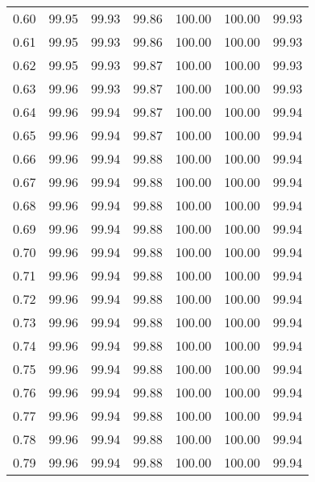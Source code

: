 \begin{tabular}{|c|c|c|c|c|c|c|}
      0.60 &     99.95 &     99.93 &      99.86 &  100.00 &     100.00 &         99.93 \\
      0.61 &     99.95 &     99.93 &      99.86 &  100.00 &     100.00 &         99.93 \\
      0.62 &     99.95 &     99.93 &      99.87 &  100.00 &     100.00 &         99.93 \\
      0.63 &     99.96 &     99.93 &      99.87 &  100.00 &     100.00 &         99.93 \\
      0.64 &     99.96 &     99.94 &      99.87 &  100.00 &     100.00 &         99.94 \\
      0.65 &     99.96 &     99.94 &      99.87 &  100.00 &     100.00 &         99.94 \\
      0.66 &     99.96 &     99.94 &      99.88 &  100.00 &     100.00 &         99.94 \\
      0.67 &     99.96 &     99.94 &      99.88 &  100.00 &     100.00 &         99.94 \\
      0.68 &     99.96 &     99.94 &      99.88 &  100.00 &     100.00 &         99.94 \\
      0.69 &     99.96 &     99.94 &      99.88 &  100.00 &     100.00 &         99.94 \\
      0.70 &     99.96 &     99.94 &      99.88 &  100.00 &     100.00 &         99.94 \\
      0.71 &     99.96 &     99.94 &      99.88 &  100.00 &     100.00 &         99.94 \\
      0.72 &     99.96 &     99.94 &      99.88 &  100.00 &     100.00 &         99.94 \\
      0.73 &     99.96 &     99.94 &      99.88 &  100.00 &     100.00 &         99.94 \\
      0.74 &     99.96 &     99.94 &      99.88 &  100.00 &     100.00 &         99.94 \\
      0.75 &     99.96 &     99.94 &      99.88 &  100.00 &     100.00 &         99.94 \\
      0.76 &     99.96 &     99.94 &      99.88 &  100.00 &     100.00 &         99.94 \\
      0.77 &     99.96 &     99.94 &      99.88 &  100.00 &     100.00 &         99.94 \\
      0.78 &     99.96 &     99.94 &      99.88 &  100.00 &     100.00 &         99.94 \\
      0.79 &     99.96 &     99.94 &      99.88 &  100.00 &     100.00 &         99.94 \\

\end{tabular}
